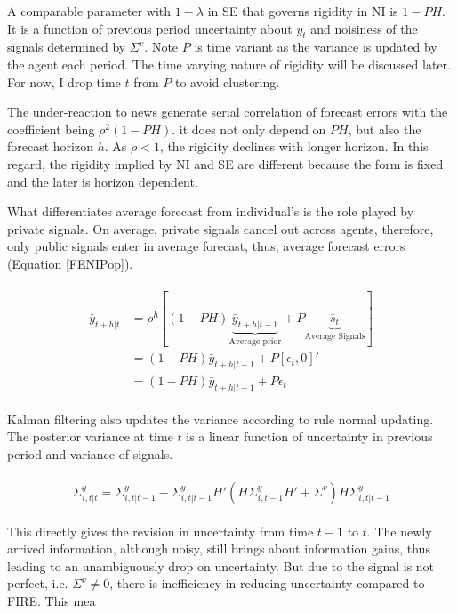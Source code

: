 \documentclass[]{article}
\begin{document}
	
	
	A comparable parameter with $1-\lambda$ in SE that governs rigidity in NI is $1-PH$. It is a function of previous period uncertainty about $y_t$ and noisiness of the signals determined by $\Sigma^v$. Note $P$ is time variant as the variance is updated by the agent each period. The time varying nature of rigidity will be discussed later. For now, I drop time $t$ from $P$ to avoid clustering.  
	
	The under-reaction to news generate serial correlation of forecast errors with the coefficient being $\rho^2(1-PH)$. it does not only depend on $PH$, but also the forecast horizon $h$. As $\rho<1$, the rigidity declines with longer horizon. In this regard, the rigidity implied by NI and SE are different because the form is fixed and the later is horizon dependent. 
	
	What differentiates average forecast from individual's is the role played by private signals. On average, private signals cancel out across agents, therefore, only public signals enter in average forecast, thus, average forecast errors (Equation \ref{FENIPop}). 
	
	\begin{eqnarray}\label{FENIPop}
		\begin{aligned}
			\bar y_{t+h|t} & = \rho^h [(1-PH) \underbrace{\bar  y_{t+h|t-1}}_{\text{Average prior}} + P \underbrace{\bar s_{t}}_{\text{Average Signals}}] \\
			& = (1-PH) \bar y_{t+h|t-1}+ P [\epsilon_t, 0]' \\
			& = (1-PH) \bar y_{t+h|t-1} + P \epsilon_t
		\end{aligned}
	\end{eqnarray}
	
	Kalman filtering also updates the variance according to rule normal updating.   The posterior variance at time $t$ is a linear function of uncertainty in previous period and variance of signals. 
	
	\begin{eqnarray}
		\begin{aligned}
			\Sigma^y_{i,t|t} = \Sigma^y_{i,t|t-1} - \Sigma^y_{i,t|t-1} H'(H \Sigma^y_{i,t-1} H' +\Sigma^v) H \Sigma^y_{i,t|t-1} 
		\end{aligned}
	\end{eqnarray}
	
	This directly gives the revision in uncertainty from time $t-1$ to $t$. The newly arrived information, although noisy, still brings about information gains, thus leading to an unambiguously drop on uncertainty. But due to the signal is not perfect, i.e. $\Sigma^v \neq 0$, there is inefficiency in reducing uncertainty compared to FIRE. This mea
	
\end{document}

